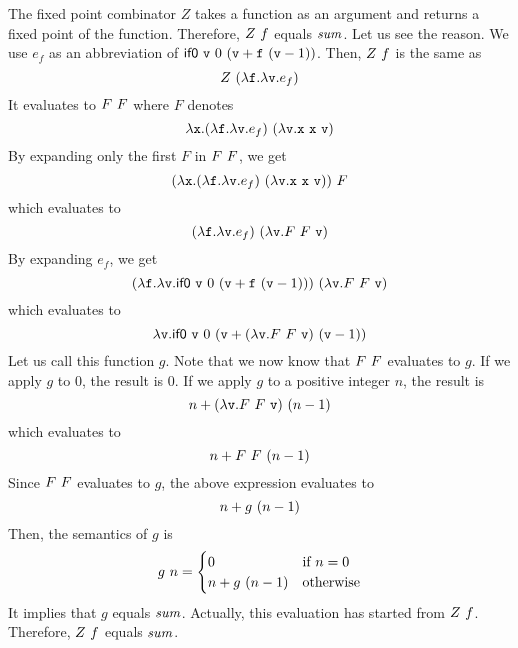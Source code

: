 The fixed point combinator $Z$ takes a function as an argument and returns a
fixed point of the function. Therefore, $Z\ f$ equals $\mbox{\emph{sum}}$. Let
us see the reason. We use $e_f$ as an abbreviation of $\textsf{if0}\ \texttt{v}\ 0\ (\texttt{v}+\texttt{f}\ (\texttt{v}-1))$.
Then, $Z\ f$ is the same as
\[ Z\ (\lambda\texttt{f}.\lambda\texttt{v}.e_f) \]
It evaluates to $F\ F$ where $F$ denotes
\[
  \lambda\texttt{x}.(\lambda\texttt{f}.\lambda\texttt{v}.e_f)\ (\lambda\texttt{v}.\texttt{x}\ \texttt{x}\ \texttt{v})
\]
By expanding only the first $F$ in $F\ F$, we get
\[
  (\lambda\texttt{x}.(\lambda\texttt{f}.\lambda\texttt{v}.e_f)\ (\lambda\texttt{v}.\texttt{x}\ \texttt{x}\ \texttt{v}))\ F
\]
which evaluates to
\[
  (\lambda\texttt{f}.\lambda\texttt{v}.e_f)\ (\lambda\texttt{v}.F\ F\ \texttt{v})
\]
By expanding $e_f$, we get
\[
  (\lambda\texttt{f}.\lambda\texttt{v}.\textsf{if0}\ \texttt{v}\ 0\ (\texttt{v}+\texttt{f}\ (\texttt{v}-1)))\ (\lambda\texttt{v}.F\ F\ \texttt{v})
\]
which evaluates to
\[
  \lambda\texttt{v}.{\textsf{if0}\ \texttt{v}\ 0\ (\texttt{v}+(\lambda\texttt{v}.F\ F\ \texttt{v})\ (\texttt{v}-1))}
\]
Let us call this function $g$. Note that we now know that $F\ F$
evaluates to $g$. If we apply $g$ to
$0$, the result is $0$. If we apply $g$ to a positive integer $n$, the result is
\[
  n+(\lambda\texttt{v}.F\ F\ \texttt{v})\ (n-1)
\]
which evaluates to
\[
  n+F\ F\ (n-1)
\]
Since ${F\ F}$ evaluates to $g$, the above expression evaluates to
\[
  n+g\ (n-1)
\]
Then, the semantics of $g$ is
\[
  g\ n=\begin{cases}
    0 & \text{if } n=0\\
    n+g\ (n-1) & \text{otherwise}
  \end{cases}
\]
It implies that $g$ equals $\mbox{\emph{sum}}$. Actually, this evaluation has started from
$Z\ f$. Therefore, $Z\ f$ equals $\mbox{\emph{sum}}$.

